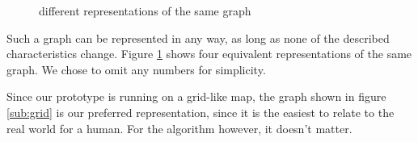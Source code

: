 \begin{figure}[h!tp]
    \centering
  	\caption{different representations of the same graph}
  	\label{fig:graphs}
\end{figure}

Such a graph can be represented in any way,
as long as none of the described characteristics change.
Figure \ref{fig:graphs} shows four equivalent representations of the same graph.
We chose to omit any numbers for simplicity.

Since our prototype is running on a grid-like map,
the graph shown in figure \ref{sub:grid} is our preferred representation,
since it is the easiest to relate to the real world for a human.
For the algorithm however, it doesn't matter.
\\\\
